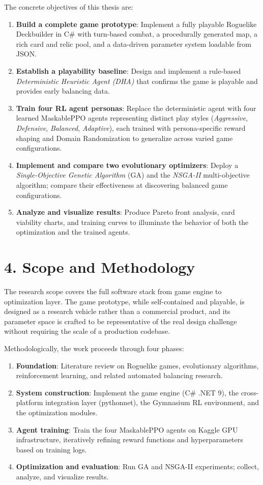 The concrete objectives of this thesis are:
\begin{enumerate}
    \item \textbf{Build a complete game prototype}: Implement a fully playable Roguelike Deckbuilder in C\# with turn-based combat, a procedurally generated map, a rich card and relic pool, and a data-driven parameter system loadable from JSON.
    \item \textbf{Establish a playability baseline}: Design and implement a rule-based \textit{Deterministic Heuristic Agent (DHA)} that confirms the game is playable and provides early balancing data.
    \item \textbf{Train four RL agent personas}: Replace the deterministic agent with four learned MaskablePPO agents representing distinct play styles (\textit{Aggressive}, \textit{Defensive}, \textit{Balanced}, \textit{Adaptive}), each trained with persona-specific reward shaping and Domain Randomization to generalize across varied game configurations.
    \item \textbf{Implement and compare two evolutionary optimizers}: Deploy a \textit{Single-Objective Genetic Algorithm} (GA) and the \textit{NSGA-II} multi-objective algorithm; compare their effectiveness at discovering balanced game configurations.
    \item \textbf{Analyze and visualize results}: Produce Pareto front analysis, card viability charts, and training curves to illuminate the behavior of both the optimization and the trained agents.
\end{enumerate}

\section*{4. Scope and Methodology}

The research scope covers the full software stack from game engine to optimization layer. The game prototype, while self-contained and playable, is designed as a research vehicle rather than a commercial product, and its parameter space is crafted to be representative of the real design challenge without requiring the scale of a production codebase.

Methodologically, the work proceeds through four phases:
\begin{enumerate}
    \item \textbf{Foundation}: Literature review on Roguelike games, evolutionary algorithms, reinforcement learning, and related automated balancing research.
    \item \textbf{System construction}: Implement the game engine (C\# .NET 9), the cross-platform integration layer (pythonnet), the Gymnasium RL environment, and the optimization modules.
    \item \textbf{Agent training}: Train the four MaskablePPO agents on Kaggle GPU infrastructure, iteratively refining reward functions and hyperparameters based on training logs.
    \item \textbf{Optimization and evaluation}: Run GA and NSGA-II experiments; collect, analyze, and visualize results.
\end{enumerate}

